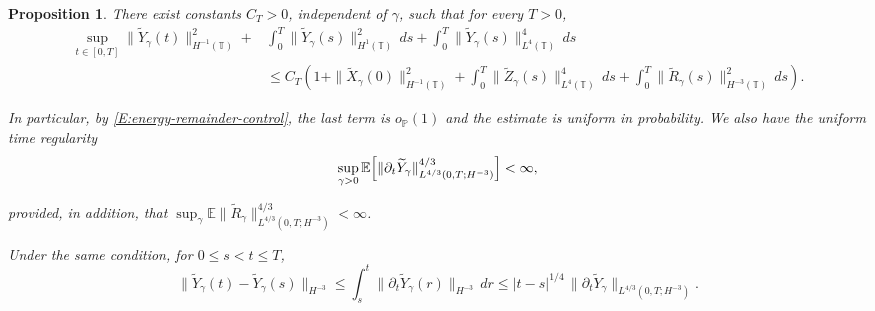 \documentclass{article}
\newtheorem{proposition}[theorem]{Proposition}
\begin{document}
\begin{proposition}\label{prop:Ygamma-Hminus1}
There exist constants \(C_T >0\), independent of \(\gamma\), such that for every \(T>0\),
\begin{align}\label{E:YH-1}
    \sup_{t\in[0,T]}\|\widetilde Y_\gamma(t)\|_{H^{-1}(\mathbb T)}^2 + &  \int_0^T\|\widetilde Y_\gamma(s)\|_{H^1(\mathbb T)}^2\,ds + \int_0^T\|\widetilde Y_\gamma(s)\|_{L^4(\mathbb T)}^4\,ds \nonumber \\
& \le C_T \left( 1+ \|\widetilde X_\gamma(0)\|_{H^{-1}(\mathbb T)}^2
+ \int_0^T\|\widetilde Z_\gamma(s)\|_{L^4 (\mathbb T)}^4\,ds
+ \int_0^T\|\widetilde R_\gamma(s)\|_{H^{-3}(\mathbb T)}^2\,ds \right).
\end{align}

In particular, by \eqref{E:energy-remainder-control}, the last term is
\(o_{\mathbb P}(1)\) and the estimate is uniform in probability.
We also have the uniform time regularity 
\begin{equation}\label{E:Ygamma-TimeR}
    \sup_{\gamma>0} \mathbb E \Bigl[ \|\partial_t \widetilde Y_\gamma\|_{L^{4/3}(0,T;H^{-3})}^{4/3} \Bigr] <\infty,
\end{equation}

provided, in addition, that
\(\sup_\gamma\mathbb E\|\widetilde R_\gamma\|_{L^{4/3}(0,T;H^{-3})}^{4/3}<\infty\).

Under the same condition, for \(0\le s<t\le T\),
\[
\|\widetilde Y_\gamma(t)-\widetilde Y_\gamma(s)\|_{H^{-3}}
\le
\int_s^t \|\partial_t\widetilde Y_\gamma(r)\|_{H^{-3}}\,dr
\le
|t-s|^{1/4}\,
\|\partial_t\widetilde Y_\gamma\|_{L^{4/3}(0,T;H^{-3})}.
\]
\end{proposition}
\end{document}
